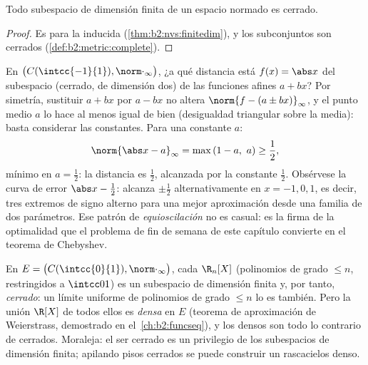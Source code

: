 \begin{corollary}\label{cor:b2:nvs:closedsubspace}
Todo subespacio de dimensión finita de un espacio normado es
cerrado.
\end{corollary}

\begin{proof}
Es  para la  inducida
(\cref{thm:b2:nvs:finitedim}), y los subconjuntos  son
cerrados (\cref{def:b2:metric:complete}).
\end{proof}

\begin{example}\label{ex:b2:nvs:bestaffine}
En $\bigl(C(\intcc{-1}{1}), \norm\cdot_\infty\bigr)$, ¿a qué
distancia está $f(x) = \abs x$ del subespacio (cerrado, de
dimensión dos) de las funciones afines $a + bx$? Por simetría,
sustituir $a + bx$ por $a - bx$ no altera $\norm{f - (a \pm
bx)}_\infty$, y el punto medio $a$ lo hace al menos igual de bien
(desigualdad triangular sobre la media): basta considerar las
constantes. Para una constante $a$:
\[
\norm{\abs x - a}_\infty = \max\,(1 - a,\ a)
\geq \frac12 ,
\]
mínimo en $a = \frac12$: la distancia es $\frac12$, alcanzada por
la constante $\frac12$. Obsérvese la curva de error $\abs x -
\frac12$: alcanza $\pm\frac12$ alternativamente en $x = -1, 0, 1$,
es decir, tres extremos de signo alterno para una mejor
aproximación desde una familia de dos parámetros. Ese patrón de
\emph{equioscilación} no es casual: es la firma de la optimalidad
que el problema de fin de semana de este capítulo convierte en el
teorema de Chebyshev.
\end{example}

\begin{example}\label{ex:b2:nvs:closeddense}
En $E = \bigl(C(\intcc{0}{1}), \norm\cdot_\infty\bigr)$, cada
$\R_n[X]$ (polinomios de grado $\leq n$, restringidos a
$\intcc01$) es un subespacio de dimensión finita y, por tanto,
\emph{cerrado}: un límite uniforme de polinomios de grado $\leq n$
lo es también. Pero la unión $\R[X]$ de todos ellos es \emph{densa}
en $E$ (teorema de aproximación de Weierstrass, demostrado en el~\cref{ch:b2:funcseq}), y los  densos son todo lo
contrario de cerrados. Moraleja: el ser cerrado es un privilegio de
los subespacios de dimensión finita; apilando pisos cerrados se
puede construir un rascacielos denso.
\end{example}


